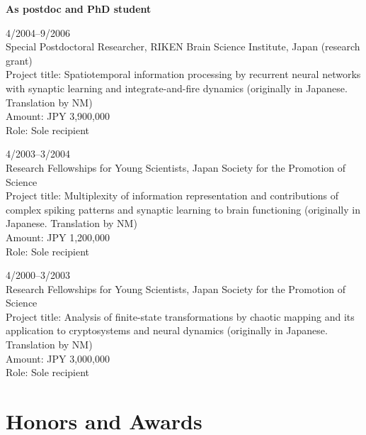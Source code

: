 \documentclass[11pt,letter]{article}
\renewenvironment{itemize}{
  \begin{list}{}{
    \setlength{\leftmargin}{1.5em}
    \setlength{\itemsep}{0.25em}
    \setlength{\parskip}{0pt}
    \setlength{\parsep}{0.25em}
  }
}{
  \end{list}
}
\begin{document}
\begin{itemize}
\item \textbf{As postdoc and PhD student}

\item 4/2004--9/2006\\
Special Postdoctoral Researcher, RIKEN Brain Science Institute, Japan (research grant)\\
Project title: Spatiotemporal information processing by recurrent neural networks with synaptic learning and integrate-and-fire dynamics (originally in Japanese. Translation by NM)\\
Amount: JPY 3,900,000\\
Role: Sole recipient

\item 4/2003--3/2004\\
Research Fellowships for Young Scientists, Japan Society for the Promotion of Science\\
Project title: Multiplexity of information representation and contributions of complex spiking patterns and synaptic learning to brain functioning (originally in Japanese. Translation by NM)\\
Amount: JPY 1,200,000\\
Role: Sole recipient

\item 4/2000--3/2003\\
Research Fellowships for Young Scientists, Japan Society for the Promotion of Science\\
Project title: Analysis of finite-state transformations by chaotic mapping and its application to cryptosystems and neural dynamics (originally in Japanese. Translation by NM)\\
Amount: JPY 3,000,000\\
Role: Sole recipient
\end{itemize}

\section*{\bf \normalsize Honors and Awards}
\end{document}
